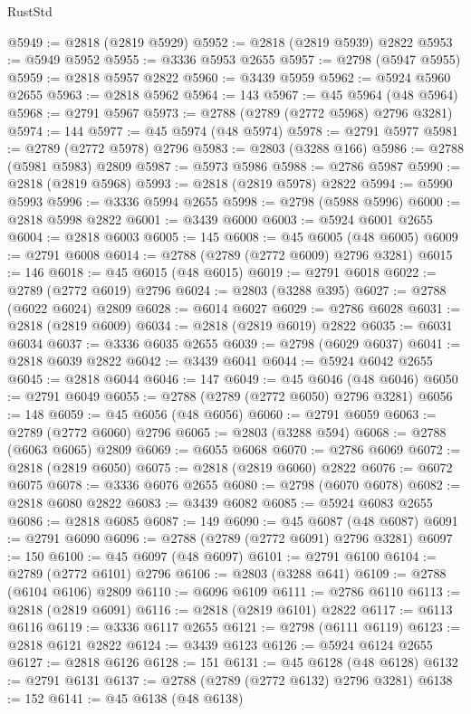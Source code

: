 \begin{lexlean}{RustStd}
\begin{coremodule}
@5949 := @2818 (@2819 @5929)
@5952 := @2818 (@2819 @5939) @2822
@5953 := @5949 @5952
@5955 := @3336 @5953 @2655
@5957 := @2798 (@5947 @5955)
@5959 := @2818 @5957 @2822
@5960 := @3439 @5959
@5962 := @5924 @5960 @2655
@5963 := @2818 @5962
@5964 := 143
@5967 := @45 @5964 (@48 @5964)
@5968 := @2791 @5967
@5973 := @2788 (@2789 (@2772 @5968) @2796 @3281)
@5974 := 144
@5977 := @45 @5974 (@48 @5974)
@5978 := @2791 @5977
@5981 := @2789 (@2772 @5978) @2796
@5983 := @2803 (@3288 @166)
@5986 := @2788 (@5981 @5983) @2809
@5987 := @5973 @5986
@5988 := @2786 @5987
@5990 := @2818 (@2819 @5968)
@5993 := @2818 (@2819 @5978) @2822
@5994 := @5990 @5993
@5996 := @3336 @5994 @2655
@5998 := @2798 (@5988 @5996)
@6000 := @2818 @5998 @2822
@6001 := @3439 @6000
@6003 := @5924 @6001 @2655
@6004 := @2818 @6003
@6005 := 145
@6008 := @45 @6005 (@48 @6005)
@6009 := @2791 @6008
@6014 := @2788 (@2789 (@2772 @6009) @2796 @3281)
@6015 := 146
@6018 := @45 @6015 (@48 @6015)
@6019 := @2791 @6018
@6022 := @2789 (@2772 @6019) @2796
@6024 := @2803 (@3288 @395)
@6027 := @2788 (@6022 @6024) @2809
@6028 := @6014 @6027
@6029 := @2786 @6028
@6031 := @2818 (@2819 @6009)
@6034 := @2818 (@2819 @6019) @2822
@6035 := @6031 @6034
@6037 := @3336 @6035 @2655
@6039 := @2798 (@6029 @6037)
@6041 := @2818 @6039 @2822
@6042 := @3439 @6041
@6044 := @5924 @6042 @2655
@6045 := @2818 @6044
@6046 := 147
@6049 := @45 @6046 (@48 @6046)
@6050 := @2791 @6049
@6055 := @2788 (@2789 (@2772 @6050) @2796 @3281)
@6056 := 148
@6059 := @45 @6056 (@48 @6056)
@6060 := @2791 @6059
@6063 := @2789 (@2772 @6060) @2796
@6065 := @2803 (@3288 @594)
@6068 := @2788 (@6063 @6065) @2809
@6069 := @6055 @6068
@6070 := @2786 @6069
@6072 := @2818 (@2819 @6050)
@6075 := @2818 (@2819 @6060) @2822
@6076 := @6072 @6075
@6078 := @3336 @6076 @2655
@6080 := @2798 (@6070 @6078)
@6082 := @2818 @6080 @2822
@6083 := @3439 @6082
@6085 := @5924 @6083 @2655
@6086 := @2818 @6085
@6087 := 149
@6090 := @45 @6087 (@48 @6087)
@6091 := @2791 @6090
@6096 := @2788 (@2789 (@2772 @6091) @2796 @3281)
@6097 := 150
@6100 := @45 @6097 (@48 @6097)
@6101 := @2791 @6100
@6104 := @2789 (@2772 @6101) @2796
@6106 := @2803 (@3288 @641)
@6109 := @2788 (@6104 @6106) @2809
@6110 := @6096 @6109
@6111 := @2786 @6110
@6113 := @2818 (@2819 @6091)
@6116 := @2818 (@2819 @6101) @2822
@6117 := @6113 @6116
@6119 := @3336 @6117 @2655
@6121 := @2798 (@6111 @6119)
@6123 := @2818 @6121 @2822
@6124 := @3439 @6123
@6126 := @5924 @6124 @2655
@6127 := @2818 @6126
@6128 := 151
@6131 := @45 @6128 (@48 @6128)
@6132 := @2791 @6131
@6137 := @2788 (@2789 (@2772 @6132) @2796 @3281)
@6138 := 152
@6141 := @45 @6138 (@48 @6138)

\end{coremodule}
\end{lexlean}
